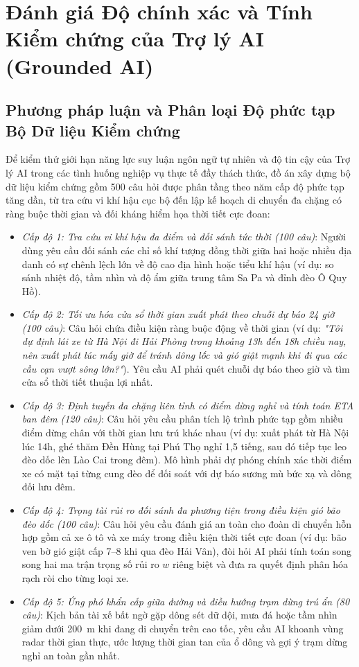 \section{Đánh giá Độ chính xác và Tính Kiểm chứng của Trợ lý AI (Grounded AI)}
\label{sec:ai_evaluation}

\subsection{Phương pháp luận và Phân loại Độ phức tạp Bộ Dữ liệu Kiểm chứng}
Để kiểm thử giới hạn năng lực suy luận ngôn ngữ tự nhiên và độ tin cậy của Trợ lý AI trong các tình huống nghiệp vụ thực tế đầy thách thức, đồ án xây dựng bộ dữ liệu kiểm chứng gồm 500 câu hỏi được phân tầng theo năm cấp độ phức tạp tăng dần, từ tra cứu vi khí hậu cục bộ đến lập kế hoạch di chuyển đa chặng có ràng buộc thời gian và đối kháng hiểm họa thời tiết cực đoan:

\begin{itemize}
    \item[-] \textit{Cấp độ 1: Tra cứu vi khí hậu đa điểm và đối sánh tức thời (100 câu)}: Người dùng yêu cầu đối sánh các chỉ số khí tượng đồng thời giữa hai hoặc nhiều địa danh có sự chênh lệch lớn về độ cao địa hình hoặc tiểu khí hậu (ví dụ: so sánh nhiệt độ, tầm nhìn và độ ẩm giữa trung tâm Sa Pa và đỉnh đèo Ô Quy Hồ).
    \item[-] \textit{Cấp độ 2: Tối ưu hóa cửa sổ thời gian xuất phát theo chuỗi dự báo 24 giờ (100 câu)}: Câu hỏi chứa điều kiện ràng buộc động về thời gian (ví dụ: \textit{"Tôi dự định lái xe từ Hà Nội đi Hải Phòng trong khoảng 13h đến 18h chiều nay, nên xuất phát lúc mấy giờ để tránh dông lốc và gió giật mạnh khi đi qua các cầu cạn vượt sông lớn?"}). Yêu cầu AI phải quét chuỗi dự báo theo giờ và tìm cửa sổ thời tiết thuận lợi nhất.
    \item[-] \textit{Cấp độ 3: Định tuyến đa chặng liên tỉnh có điểm dừng nghỉ và tính toán ETA ban đêm (120 câu)}: Câu hỏi yêu cầu phân tích lộ trình phức tạp gồm nhiều điểm dừng chân với thời gian lưu trú khác nhau (ví dụ: xuất phát từ Hà Nội lúc 14h, ghé thăm Đền Hùng tại Phú Thọ nghỉ 1,5 tiếng, sau đó tiếp tục leo đèo dốc lên Lào Cai trong đêm). Mô hình phải dự phóng chính xác thời điểm xe có mặt tại từng cung đèo để đối soát với dự báo sương mù bức xạ và dông đối lưu đêm.
    \item[-] \textit{Cấp độ 4: Trọng tài rủi ro đối sánh đa phương tiện trong điều kiện gió bão đèo dốc (100 câu)}: Câu hỏi yêu cầu đánh giá an toàn cho đoàn di chuyển hỗn hợp gồm cả xe ô tô và xe máy trong điều kiện thời tiết cực đoan (ví dụ: bão ven bờ gió giật cấp 7--8 khi qua đèo Hải Vân), đòi hỏi AI phải tính toán song song hai ma trận trọng số rủi ro $w$ riêng biệt và đưa ra quyết định phân hóa rạch ròi cho từng loại xe.
    \item[-] \textit{Cấp độ 5: Ứng phó khẩn cấp giữa đường và điều hướng trạm dừng trú ẩn (80 câu)}: Kịch bản tài xế bất ngờ gặp dông sét dữ dội, mưa đá hoặc tầm nhìn giảm dưới 200~m khi đang di chuyển trên cao tốc, yêu cầu AI khoanh vùng radar thời gian thực, ước lượng thời gian tan của ổ dông và gợi ý trạm dừng nghỉ an toàn gần nhất.
\end{itemize}

